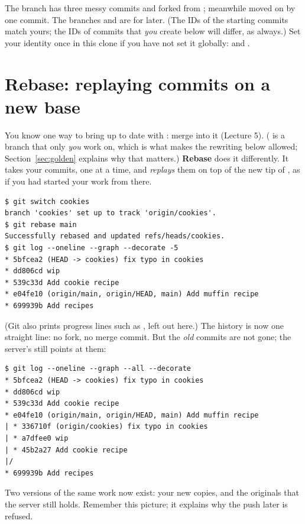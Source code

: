 The branch  has three messy commits and forked from ; meanwhile  moved on by one commit. The branches  and  are for later. (The IDs of the starting commits match yours; the IDs of commits that \emph{you} create below will differ, as always.) Set your identity once in this clone if you have not set it globally:  and .

\section{Rebase: replaying commits on a new base}

You know one way to bring  up to date with : merge  into it (Lecture 5). ( is a branch that only \emph{you} work on, which is what makes the rewriting below allowed; Section~\ref{sec:golden} explains why that matters.) \textbf{Rebase} does it differently. It takes your commits, one at a time, and \emph{replays} them on top of the new tip of , as if you had started your work from there.

\begin{lstlisting}
$ git switch cookies
branch 'cookies' set up to track 'origin/cookies'.
$ git rebase main
Successfully rebased and updated refs/heads/cookies.
$ git log --oneline --graph --decorate -5
* 5bfcea2 (HEAD -> cookies) fix typo in cookies
* dd806cd wip
* 539c33d Add cookie recipe
* e04fe10 (origin/main, origin/HEAD, main) Add muffin recipe
* 699939b Add recipes
\end{lstlisting}

(Git also prints progress lines such as , left out here.) The history is now one straight line: no fork, no merge commit. But the \emph{old} commits are not gone; the server's  still points at them:

\begin{lstlisting}
$ git log --oneline --graph --all --decorate
* 5bfcea2 (HEAD -> cookies) fix typo in cookies
* dd806cd wip
* 539c33d Add cookie recipe
* e04fe10 (origin/main, origin/HEAD, main) Add muffin recipe
| * 336710f (origin/cookies) fix typo in cookies
| * a7dfee0 wip
| * 45b2a27 Add cookie recipe
|/
* 699939b Add recipes
\end{lstlisting}

Two versions of the same work now exist: your new copies, and the originals that the server still holds. Remember this picture; it explains why the push later is refused.

